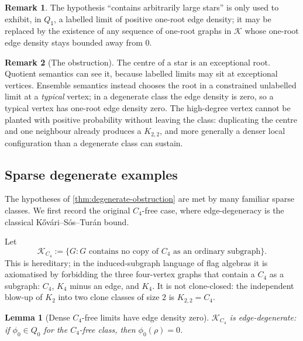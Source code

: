 \documentclass[11pt]{article}
\newtheorem{lemma}[lemma]{Lemma}
\theoremstyle{definition}
\newtheorem{remark}[remark]{Remark}
\newcommand{\K}{\mathcal{K}}
\newcommand{\vtype}{\mathsf{1}}
\begin{document}
\begin{remark}
The hypothesis ``contains arbitrarily large stars'' is only used to exhibit, in
$Q_{\vtype}$, a labelled limit of positive one-root edge density; it may be replaced by the
existence of any sequence of one-root graphs in $\K$ whose one-root edge density stays
bounded away from $0$.
\end{remark}

\begin{remark}[The obstruction]
The centre of a star is an exceptional root.  Quotient semantics can see
it, because labelled limits may sit at exceptional vertices.  Ensemble semantics
instead chooses the root in a constrained unlabelled limit at a \emph{typical} vertex; in a
degenerate class the edge density is zero, so a typical vertex has one-root edge
density zero.  The high-degree vertex cannot be planted with positive probability
without leaving the class: duplicating the centre and one neighbour already produces
a $K_{2,2}$, and more generally a denser local configuration than a degenerate class can
sustain.
\end{remark}

\subsection{Sparse degenerate examples}

The hypotheses of \cref{thm:degenerate-obstruction} are met by many familiar
sparse classes.  We first record the original $C_4$-free case, where edge-degeneracy
is the classical K\H{o}v\'ari--S\'os--Tur\'an bound.

Let
\[
  \K_{C_4}:=\{G:\text{$G$ contains no copy of $C_4$ as an ordinary subgraph}\}.
\]
This is hereditary; in the induced-subgraph language of flag algebras it is
axiomatised by forbidding the three four-vertex graphs that contain a $C_4$ as a
subgraph: $C_4$, $K_4$ minus an edge, and $K_4$.  It is not clone-closed: the
independent blow-up of $K_2$ into two clone classes of size $2$ is $K_{2,2}=C_4$.

\begin{lemma}[Dense \texorpdfstring{$C_4$}{C4}-free limits have edge density zero]\label{lem:c4-edge-zero}
$\K_{C_4}$ is edge-degenerate: if $\phi_0\in Q_0$ for the $C_4$-free class, then
$\phi_0(\rho)=0$.
\end{lemma}
\end{document}
